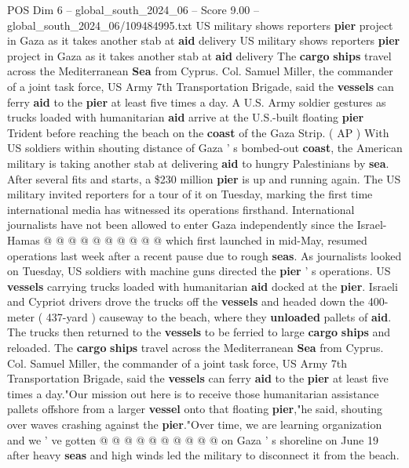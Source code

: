 \begin{textsample}{POS Dim 6 – global\_south\_2024\_06 – Score 9.00 – global\_south\_2024\_06/109484995.txt}  \label{ex:f6_pos_171}
US military shows reporters \textbf{pier} project in Gaza as it takes another stab at \textbf{aid} delivery US military shows reporters \textbf{pier} project in Gaza as it takes another stab at \textbf{aid} delivery The \textbf{cargo} \textbf{ships} travel across the Mediterranean \textbf{Sea} from Cyprus.
Col.
Samuel Miller, the commander of a joint task force, US Army 7th Transportation Brigade, said the \textbf{vessels} can ferry \textbf{aid} to the \textbf{pier} at least five times a day.
A U.S.
Army soldier gestures as trucks loaded with humanitarian \textbf{aid} arrive at the U.S.-built floating \textbf{pier} Trident before reaching the beach on the \textbf{coast} of the Gaza Strip. ( AP ) With US soldiers within shouting distance of Gaza ' s bombed-out \textbf{coast}, the American military is taking another stab at delivering \textbf{aid} to hungry Palestinians by \textbf{sea}.
After several fits and starts, a \$230 million \textbf{pier} is up and running again.
The US military invited reporters for a tour of it on Tuesday, marking the first time international media has witnessed its operations firsthand.
International journalists have not been allowed to enter Gaza independently since the Israel-Hamas @ @ @ @ @ @ @ @ @ @ which first launched in mid-May, resumed operations last week after a recent pause due to rough \textbf{seas}.
As journalists looked on Tuesday, US soldiers with machine guns directed the \textbf{pier} ' s operations.
US \textbf{vessels} carrying trucks loaded with humanitarian \textbf{aid} docked at the \textbf{pier}.
Israeli and Cypriot drivers drove the trucks off the \textbf{vessels} and headed down the 400-meter ( 437-yard ) causeway to the beach, where they \textbf{unloaded} pallets of \textbf{aid}.
The trucks then returned to the \textbf{vessels} to be ferried to large \textbf{cargo} \textbf{ships} and reloaded.
The \textbf{cargo} \textbf{ships} travel across the Mediterranean \textbf{Sea} from Cyprus.
Col.
Samuel Miller, the commander of a joint task force, US Army 7th Transportation Brigade, said the \textbf{vessels} can ferry \textbf{aid} to the \textbf{pier} at least five times a day."Our mission out here is to receive those humanitarian assistance pallets offshore from a larger \textbf{vessel} onto that floating \textbf{pier},"he said, shouting over waves crashing against the \textbf{pier}."Over time, we are learning organization and we ' ve gotten @ @ @ @ @ @ @ @ @ @ on Gaza ' s shoreline on June 19 after heavy \textbf{seas} and high winds led the military to disconnect it from the beach.

\end{textsample}
